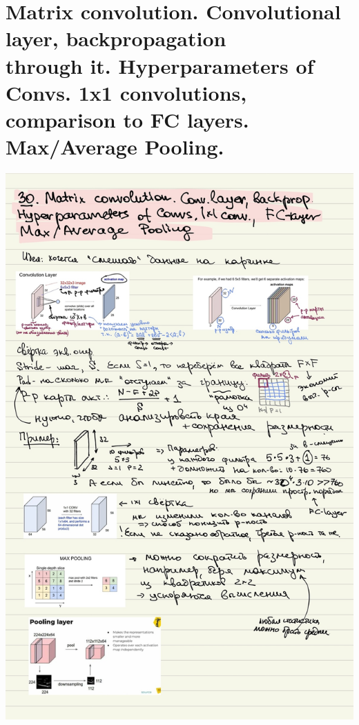 \section{Matrix convolution. Convolutional layer, backpropagation \\ through it. Hyperparameters of Convs. 1x1 convolutions, comparison to FC layers. Max/Average Pooling.}
\includegraphics[width=400pt]{images/30.JPG}
\newpage


